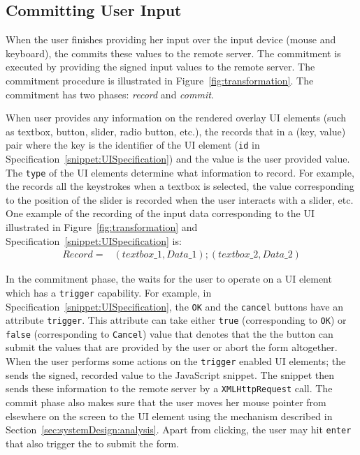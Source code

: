 \subsection{Committing User Input}
\label{sec:systemDesign:commit}

When the user finishes providing her input over the input device (mouse and keyboard), the \device commits these values to the remote server. The commitment is executed by providing the signed input values to the remote server. The commitment procedure is illustrated in Figure~\ref{fig:transformation}. The commitment has two phases: \emph{record} and \emph{commit}.

 When user provides any information on the rendered overlay UI elements (such as textbox, button, slider, radio button, etc.), the \device records that in a (key, value) pair where the key is the identifier of the UI element (\texttt{id} in Specification~\ref{snippet:UISpecification}) and the value is the user provided value. The \texttt{type} of the UI elements determine what information to record. For example, the \device records all the keystrokes when a textbox is selected, the value corresponding to the position of the slider is recorded when the user interacts with a slider, etc. One example of the recording of the input data corresponding to the UI illustrated in Figure~\ref{fig:transformation} and Specification~\ref{snippet:UISpecification} is: 
\begin{align*}
Record = & (textbox\_1, Data\_1);(textbox\_2,Data\_2)
\end{align*}

 In the commitment phase, the \device waits for the user to operate on a UI element which has a \texttt{trigger} capability. For example, in Specification~\ref{snippet:UISpecification}, the \texttt{OK} and the \texttt{cancel} buttons have an attribute \texttt{trigger}. This attribute can take either \texttt{true} (corresponding to \texttt{OK}) or \texttt{false} (corresponding to \texttt{Cancel}) value that denotes that the the button can submit the values that are provided by the user or abort the form altogether. When the user performs some actions on the \texttt{trigger} enabled UI elements; the \device sends the signed, recorded value to the \name JavaScript snippet. The \name \js snippet then sends these information to the remote server by a \texttt{XMLHttpRequest} call. The commit phase also makes sure that the user moves her mouse pointer from elsewhere on the screen to the UI element using the \pop mechanism described in Section~\ref{sec:systemDesign:analysis}. Apart from clicking, the user may hit \texttt{enter} that also trigger the \device to submit the form. 


